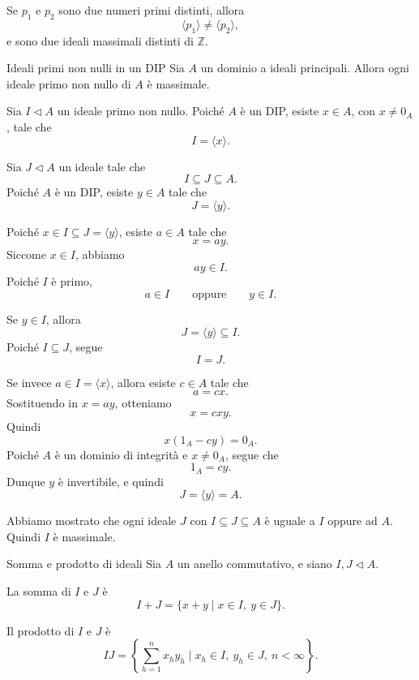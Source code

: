 \documentclass[a4paper]{article}
\begin{document}
\begin{radioactive}
Se \(p_1\) e \(p_2\) sono due numeri primi distinti, allora
\[
    \langle p_1 \rangle\neq \langle p_2 \rangle,
\]
e sono due ideali massimali distinti di \(\mathbb{Z}\).
\end{radioactive}

\begin{radioactive}
\begin{snippetproposition}{Ideali primi non nulli in un DIP}
    Sia \(A\) un dominio a ideali principali. Allora ogni ideale primo non nullo di \(A\) è massimale.
\end{snippetproposition}
\end{radioactive}

\begin{radioactive}
\begin{snippetproof}{}
    Sia \(I\triangleleft A\) un ideale primo non nullo.
    Poiché \(A\) è un DIP, esiste \(x\in A\), con \(x\neq 0_A\), tale che
    \[
        I=\langle x \rangle.
    \]

    Sia \(J\triangleleft A\) un ideale tale che
    \[
        I\subseteq J\subseteq A.
    \]
    Poiché \(A\) è un DIP, esiste \(y\in A\) tale che
    \[
        J=\langle y \rangle.
    \]

    Poiché \(x\in I\subseteq J=\langle y \rangle\), esiste \(a\in A\) tale che
    \[
        x=ay.
    \]
    Siccome \(x\in I\), abbiamo
    \[
        ay\in I.
    \]
    Poiché \(I\) è primo,
    \[
        a\in I
        \qquad
        \text{oppure}
        \qquad
        y\in I.
    \]

    Se \(y\in I\), allora
    \[
        J=\langle y \rangle\subseteq I.
    \]
    Poiché \(I\subseteq J\), segue
    \[
        I=J.
    \]

    Se invece \(a\in I=\langle x \rangle\), allora esiste \(c\in A\) tale che
    \[
        a=cx.
    \]
    Sostituendo in \(x=ay\), otteniamo
    \[
        x=cxy.
    \]
    Quindi
    \[
        x(1_A-cy)=0_A.
    \]
    Poiché \(A\) è un dominio di integrità e \(x\neq 0_A\), segue che
    \[
        1_A=cy.
    \]
    Dunque \(y\) è invertibile, e quindi
    \[
        J=\langle y \rangle=A.
    \]

    Abbiamo mostrato che ogni ideale \(J\) con \(I\subseteq J\subseteq A\) è uguale a \(I\) oppure ad \(A\). Quindi \(I\) è massimale.
\end{snippetproof}
\end{radioactive}

\begin{radioactive}
\begin{snippetdefinition}{Somma e prodotto di ideali}
    Sia \(A\) un anello commutativo, e siano \(I,J\triangleleft A\).

    La somma di \(I\) e \(J\) è
    \[
        I+J
        =
        \{x+y\mid x\in I,\ y\in J\}.
    \]

    Il prodotto di \(I\) e \(J\) è
    \[
        IJ
        =
        \left\{
            \sum_{h=1}^n x_hy_h
            \mid
            x_h\in I,\ y_h\in J,\ n<\infty
        \right\}.
    \]
\end{snippetdefinition}
\end{radioactive}
\end{document}
